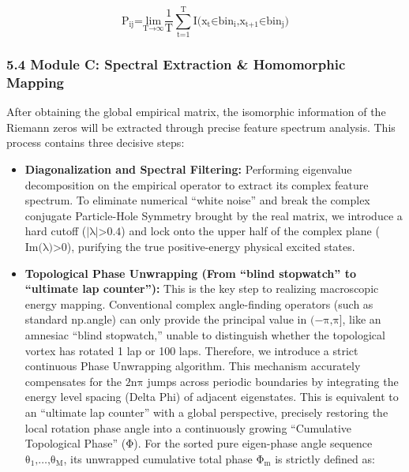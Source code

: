 \[\text{P}_{\text{ij}}\text{=}\underset{\text{T}\text{→∞}}{\text{lim}}\frac{\text{1}}{\text{T}}\sum_{\text{t}\text{=1}}^{\text{T}}\text{I}\text{(}\text{x}_{\text{t}}\text{∈}\text{bin}_{\text{i}}\text{,}\text{x}_{\text{t}\text{+1}}\text{∈}\text{bin}_{\text{j}}\text{)}\]

\hypertarget{module-c-spectral-extraction-homomorphic-mapping}{%
\subsubsection{\texorpdfstring{\textbf{5.4 Module C: Spectral Extraction
\& Homomorphic
Mapping}}{5.4 Module C: Spectral Extraction \& Homomorphic Mapping}}\label{module-c-spectral-extraction-homomorphic-mapping}}

After obtaining the global empirical matrix, the isomorphic information
of the Riemann zeros will be extracted through precise feature spectrum
analysis. This process contains three decisive steps:

\begin{itemize}
\item
  \textbf{Diagonalization and Spectral Filtering:} Performing eigenvalue
  decomposition on the empirical operator to extract its complex feature
  spectrum. To eliminate numerical ``white noise'' and break the complex
  conjugate Particle-Hole Symmetry brought by the real matrix, we
  introduce a hard cutoff (\(\text{|}\text{λ}\text{|>0.4}\)) and lock
  onto the upper half of the complex plane
  (\(\text{Im(}\text{λ}\text{)>0}\)), purifying the true positive-energy
  physical excited states.
\item
  \textbf{Topological Phase Unwrapping (From ``blind stopwatch'' to
  ``ultimate lap counter''):} This is the key step to realizing
  macroscopic energy mapping. Conventional complex angle-finding
  operators (such as standard np.angle) can only provide the principal
  value in \(\text{(−}\text{π}\text{,}\text{π}\text{]}\), like an
  amnesiac ``blind stopwatch,'' unable to distinguish whether the
  topological vortex has rotated 1 lap or 100 laps. Therefore, we
  introduce a strict continuous Phase Unwrapping algorithm. This
  mechanism accurately compensates for the \(\text{2}\text{nπ}\) jumps
  across periodic boundaries by integrating the energy level spacing
  (Delta Phi) of adjacent eigenstates. This is equivalent to an
  ``ultimate lap counter'' with a global perspective, precisely
  restoring the local rotation phase angle into a continuously growing
  ``Cumulative Topological Phase'' (\(\text{Φ}\)). For the sorted pure
  eigen-phase angle sequence
  \(\text{θ}_{\text{1}}\text{,…,}\text{θ}_{\text{M}}\), its unwrapped
  cumulative total phase \(\text{Φ}_{\text{m}}\) is strictly defined as:
\end{itemize}

